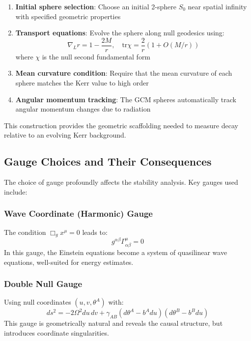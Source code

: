 \documentclass[12pt,a4paper]{article}
\begin{document}
\begin{enumerate}
    \item \textbf{Initial sphere selection}: Choose an initial 2-sphere $S_0$ near spatial infinity with specified geometric properties
    
    \item \textbf{Transport equations}: Evolve the sphere along null geodesics using:
    \begin{equation}
    \nabla_L r = 1 - \frac{2M}{r}, \quad \text{tr}\chi = \frac{2}{r}(1 + O(M/r))
    \end{equation}
    where $\chi$ is the null second fundamental form
    
    \item \textbf{Mean curvature condition}: Require that the mean curvature of each sphere matches the Kerr value to high order
    
    \item \textbf{Angular momentum tracking}: The GCM spheres automatically track angular momentum changes due to radiation
\end{enumerate}

This construction provides the geometric scaffolding needed to measure decay relative to an evolving Kerr background.

\subsection{Gauge Choices and Their Consequences}

The choice of gauge profoundly affects the stability analysis. Key gauges used include:

\subsubsection{Wave Coordinate (Harmonic) Gauge}
The condition $\Box_g x^\mu = 0$ leads to:
\begin{equation}
g^{\alpha\beta}\Gamma^\mu_{\alpha\beta} = 0
\end{equation}
In this gauge, the Einstein equations become a system of quasilinear wave equations, well-suited for energy estimates.

\subsubsection{Double Null Gauge}
Using null coordinates $(u, v, \theta^A)$ with:
\begin{equation}
ds^2 = -2\Omega^2 du\,dv + \gamma_{AB}(d\theta^A - b^A du)(d\theta^B - b^B du)
\end{equation}
This gauge is geometrically natural and reveals the causal structure, but introduces coordinate singularities.
\end{document}
